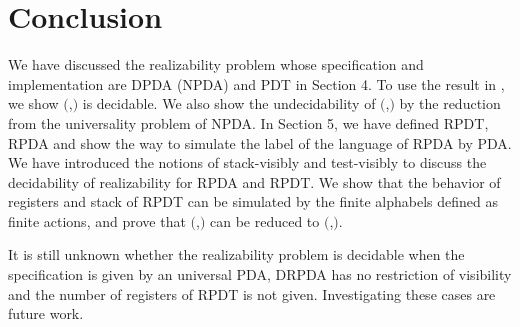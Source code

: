 \section{Conclusion}
We have discussed the realizability problem
whose specification and implementation are
DPDA (NPDA) and PDT in Section 4.
To use the result in \cite{Wa96},
we show \Real$($\DPDA,\PDT$)$ is decidable.
We also show the undecidability of \Real$($\NPDA,\PDT$)$
by the reduction from the universality problem of NPDA.
In Section 5, we have defined RPDT, RPDA and
show the way to simulate the label of the language of RPDA by PDA.
We have introduced the notions of stack-visibly \cite{AM04} and
test-visibly to discuss the decidability of realizability
for RPDA and RPDT.
We show that the behavior of registers and stack of RPDT
can be simulated by the finite alphabels defined as finite actions,
and prove that \Real$($\DRPDAv,\RPDTk$)$ can be reduced to \Real$($\DPDA,\PDT$)$.

It is still unknown whether the realizability problem is decidable
when the specification is given by an universal PDA,
DRPDA has no restriction of visibility and
the number of registers of RPDT is not given.
Investigating these cases are future work.
